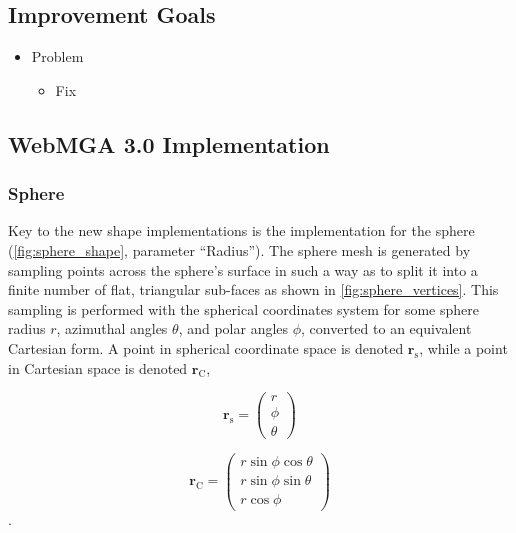 \subsection{Improvement Goals}
\begin{itemize}
  \item Problem
    \begin{itemize}
      \item Fix
    \end{itemize}
\end{itemize}

\subsection{WebMGA 3.0 Implementation}
\subsubsection{Sphere}
\label{sphere_gen_sec}
Key to the new shape implementations is the implementation for the sphere (\cref{fig:sphere_shape}, parameter ``Radius''). The sphere mesh is generated by sampling points across the sphere's surface in such a way as to split it into a finite number of flat, triangular sub-faces as shown in \cref{fig:sphere_vertices}. This sampling is performed with the spherical coordinates system for some sphere radius $r$, azimuthal angles $\theta$, and polar angles $\phi$, converted to an equivalent Cartesian form. A point in spherical coordinate space is denoted $\mathbf{r}_\mathrm{s}$, while a point in Cartesian space is denoted $\mathbf{r}_\mathrm{C}$,

\begin{equation}
\mathbf{r}_\mathrm{s}=\begin{pmatrix}r\\\phi\\\theta\end{pmatrix}
\label{sphere_equation_spherical}
\end{equation}

\begin{equation}
\mathbf{r}_\mathrm{C}=\begin{pmatrix}r\sin\phi \cos\theta\\
r\sin\phi \sin\theta\\
r\cos\phi\end{pmatrix}
\label{sphere_equation_cartesian}
\end{equation}.


